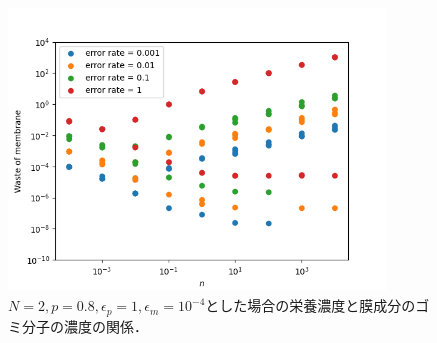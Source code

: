 \documentclass[a4paper,11pt]{jsarticle}
\begin{document}
\begin{figure}[htbp]
  \centering
  \includegraphics[width=10cm]{waste_N2_T5_p08_ep1_em4.png}
  \caption{$N=2,p=0.8,\epsilon_p = 1, \epsilon_m = 10^{-4}$とした場合の栄養濃度と膜成分のゴミ分子の濃度の関係．}
  \label{fig:ep1_em04}
\end{figure}
\end{document}

